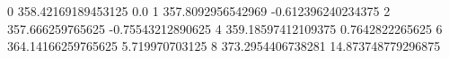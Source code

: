 0 358.42169189453125 0.0
1 357.8092956542969 -0.612396240234375
2 357.666259765625 -0.75543212890625
4 359.18597412109375 0.7642822265625
6 364.14166259765625 5.719970703125
8 373.2954406738281 14.873748779296875
